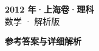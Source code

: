 \documentclass[zihao=-4, a4paper]{ctexart}
\begin{document}
\begin{center}
  {\Large\bfseries 2012 年·上海卷·理科}\\[4pt]
  {\large 数学 · 解析版}
\end{center}
\medskip
{}

\clearpage
{}
\begin{center}{\Large\bfseries 参考答案与详细解析}\end{center}
\medskip

\end{document}
